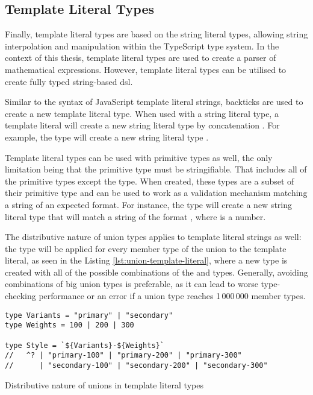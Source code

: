 \subsection{Template Literal Types}

Finally, template literal types are based on the string literal types, allowing string interpolation and manipulation within the TypeScript type system. In the context of this thesis, template literal types are used to create a parser of mathematical expressions. However, template literal types can be utilised to create fully typed string-based \acrfull{dsl}.

Similar to the syntax of JavaScript template literal strings, backticks are used to create a new template literal type. When used with a string literal type, a template literal will create a new string literal type by concatenation \cite{DocumentationTemplateLiteral}. For example, the type  will create a new string literal type .

Template literal types can be used with primitive types as well, the only limitation being that the primitive type must be stringifiable. That includes all of the primitive types except the  type. When created, these types are a subset of their primitive type and can be used to work as a validation mechanism matching a string of an expected format. For instance, the type  will create a new string literal type that will match a string of the format , where  is a number.

The distributive nature of union types applies to template literal strings as well: the type will be applied for every member type of the union to the template literal, as seen in the Listing \ref{lst:union-template-literal}, where a new  type is created with all of the possible combinations of the  and  types. Generally, avoiding combinations of big union types is preferable, as it can lead to worse type-checking performance or an error if a union type reaches 1\,000\,000 member types.

\begin{listing}[ht]
  \begin{verbatim}
type Variants = "primary" | "secondary"
type Weights = 100 | 200 | 300

type Style = `${Variants}-${Weights}`
//   ^? | "primary-100" | "primary-200" | "primary-300" 
//      | "secondary-100" | "secondary-200" | "secondary-300"
\end{verbatim}
  \caption{Distributive nature of unions in template literal types}\label{lst:union-template-literal}
\end{listing}

